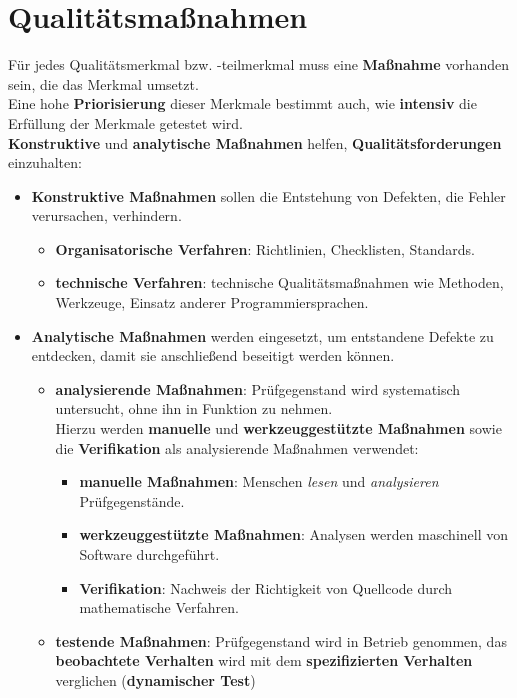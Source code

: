 \section{Qualitätsmaßnahmen}

\begin{tcolorbox}[title=Qualitätsmaßnahmen]

    Für jedes Qualitätsmerkmal bzw. -teilmerkmal muss eine \textbf{Maßnahme} vorhanden sein, die das Merkmal umsetzt.\\
    Eine hohe \textbf{Priorisierung} dieser Merkmale bestimmt auch, wie \textbf{intensiv} die Erfüllung der Merkmale getestet wird.\\

    \noindent
    \textbf{Konstruktive} und \textbf{analytische Maßnahmen} helfen, \textbf{Qualitätsforderungen} einzuhalten:

    \begin{itemize}
            \item  \textbf{Konstruktive Maßnahmen} sollen die Entstehung von Defekten, die Fehler verursachen, verhindern.
            \begin{itemize}
                \item \textbf{Organisatorische Verfahren}: Richtlinien, Checklisten, Standards.
                \item \textbf{technische Verfahren}: technische Qualitätsmaßnahmen wie Methoden, Werkzeuge, Einsatz anderer Programmiersprachen.
            \end{itemize}
            \item \textbf{Analytische Maßnahmen} werden eingesetzt, um entstandene Defekte zu entdecken, damit sie anschließend beseitigt werden können.
            \begin{itemize}
                \item \textbf{analysierende Maßnahmen}: Prüfgegenstand wird systematisch untersucht, ohne ihn in Funktion zu nehmen.\\
                Hierzu werden \textbf{manuelle} und \textbf{werkzeuggestützte Maßnahmen} sowie die \textbf{Verifikation} als analysierende Maßnahmen verwendet:
                \begin{itemize}
                    \item \textbf{manuelle Maßnahmen}: Menschen \textit{lesen} und \textit{analysieren} Prüfgegenstände.
                    \item \textbf{werkzeuggestützte Maßnahmen}: Analysen werden maschinell von Software durchgeführt.
                    \item \textbf{Verifikation}: Nachweis der Richtigkeit von Quellcode durch mathematische Verfahren.
                \end{itemize}
                \item  \textbf{testende Maßnahmen}: Prüfgegenstand wird in Betrieb genommen, das \textbf{beobachtete Verhalten} wird mit dem \textbf{spezifizierten Verhalten} verglichen (\textbf{dynamischer Test})
            \end{itemize}
        \end{itemize}


\end{tcolorbox}


